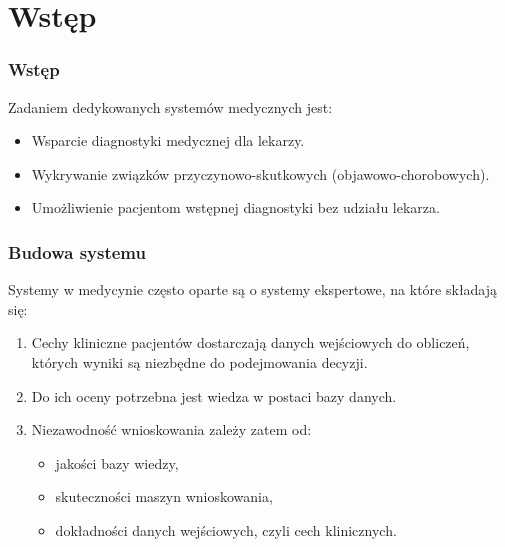 \section{Wstęp}

\begin{frame}
\frametitle{Wstęp}

Zadaniem dedykowanych systemów medycznych jest:
\begin{itemize}
 \item Wsparcie diagnostyki medycznej dla lekarzy.
 \item Wykrywanie związków przyczynowo-skutkowych (objawowo-chorobowych).
 \item Umożliwienie pacjentom wstępnej diagnostyki bez udziału lekarza.
\end{itemize}

\end{frame}

\begin{frame}
\frametitle{Budowa systemu}

Systemy w medycynie często oparte są o systemy ekspertowe, na które składają się:
\begin{enumerate}
\item Cechy kliniczne pacjentów dostarczają danych wejściowych do obliczeń, których wyniki są niezbędne do podejmowania decyzji.
\item Do ich oceny potrzebna jest wiedza w postaci bazy danych.
\item Niezawodność wnioskowania zależy zatem od:
  \begin{itemize}
    \item jakości bazy wiedzy,
    \item skuteczności maszyn wnioskowania,
    \item dokładności danych wejściowych, czyli cech klinicznych.
  \end{itemize}
\end{enumerate}
\end{frame}
